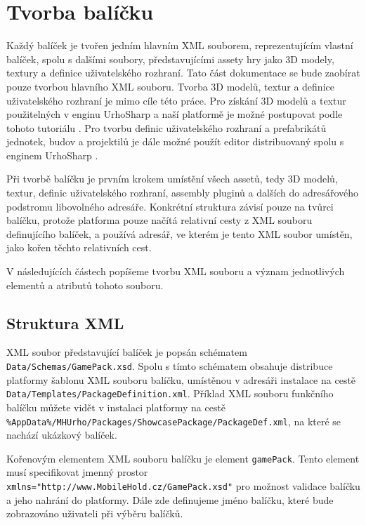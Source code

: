 \chapter{Tvorba balíčku}
\label{sec:packagemaking}
Každý balíček je tvořen jedním hlavním XML souborem, reprezentujícím vlastní balíček, spolu s dalšími soubory, představujícími assety hry jako 3D modely, textury a definice uživatelského rozhraní. Tato část dokumentace se bude zaobírat pouze tvorbou hlavního XML souboru. Tvorba 3D modelů, textur a definice uživatelského rozhraní je mimo cíle této práce. Pro získání 3D modelů a textur použitelných v enginu UrhoSharp a naší platformě je možné postupovat podle tohoto tutoriálu \citep{https://urho3d.fandom.com/wiki/Blender_to_Urho3D_Guide}. Pro tvorbu definic uživatelského rozhraní a prefabrikátů jednotek, budov a projektilů je dále možné použít editor distribuovaný spolu s enginem UrhoSharp \citep{https://urho3d.github.io/documentation/1.7/_editor_instructions.html}.

Při tvorbě balíčku je prvním krokem umístění všech assetů, tedy 3D modelů, textur, definic uživatelského rozhraní, assembly pluginů a dalších do adresářového podstromu libovolného adresáře. Konkrétní struktura závisí pouze na tvůrci balíčku, protože platforma pouze načítá relativní cesty z XML souboru definujícího balíček, a používá adresář, ve kterém je tento XML soubor umístěn, jako kořen těchto relativních cest. 

V následujících částech popíšeme tvorbu XML souboru a význam jednotlivých elementů a atributů tohoto souboru.
\section{Struktura XML}
XML soubor představující balíček je popsán schématem \texttt{Data/Schemas/GamePack.xsd}. Spolu s tímto schématem obsahuje distribuce platformy šablonu XML souboru balíčku, umístěnou v adresáři instalace na cestě \texttt{Data/Templates/PackageDefinition.xml}. Příklad XML souboru funkčního balíčku můžete vidět v instalaci platformy na cestě \texttt{\%AppData\%/MHUrho/Packages/ShowcasePackage/PackageDef.xml}, na které se nachází ukázkový balíček. 

Kořenovým elementem XML souboru balíčku je element \texttt{gamePack}. Tento element musí specifikovat jmenný prostor \texttt{xmlns="http://www.MobileHold.cz/GamePack.xsd"} pro možnost validace balíčku a jeho nahrání do platformy. Dále zde  definujeme jméno balíčku, které bude zobrazováno uživateli při výběru balíčků. 

